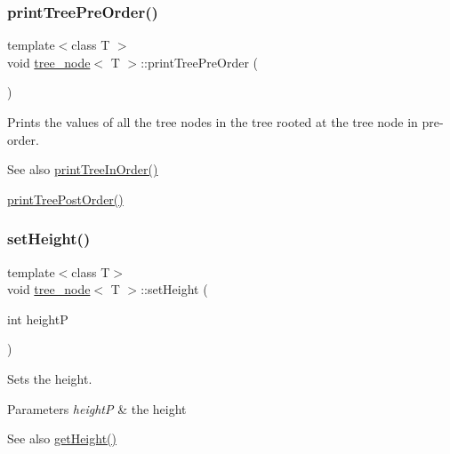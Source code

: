 \subsubsection{\texorpdfstring{print\+Tree\+Pre\+Order()}{printTreePreOrder()}}
{\footnotesize\ttfamily template$<$class T $>$ \\
void \hyperlink{classtree__node}{tree\+\_\+node}$<$ T $>$\+::print\+Tree\+Pre\+Order (\begin{DoxyParamCaption}{ }\end{DoxyParamCaption})}

Prints the values of all the tree nodes in the tree rooted at the tree node in pre-\/order. \begin{DoxySeeAlso}{See also}
\hyperlink{classtree__node_ae87818a195621d4defc1cde67e7219ee}{print\+Tree\+In\+Order()} 

\hyperlink{classtree__node_a4bfdd2b618c15252fcfbeab46ca05861}{print\+Tree\+Post\+Order()} 
\end{DoxySeeAlso}
\mbox{\label{classtree__node_a159ebd6d96c0e2111eb0ef6a36d50471}} 
\subsubsection{\texorpdfstring{set\+Height()}{setHeight()}}
{\footnotesize\ttfamily template$<$class T$>$ \\
void \hyperlink{classtree__node}{tree\+\_\+node}$<$ T $>$\+::set\+Height (\begin{DoxyParamCaption}\item[{int}]{heightP }\end{DoxyParamCaption})\hspace{0.3cm}{\ttfamily [inline]}}

Sets the height. 
\begin{DoxyParams}{Parameters}
{\em heightP} & the height \\
\hline
\end{DoxyParams}
\begin{DoxySeeAlso}{See also}
\hyperlink{classtree__node_a57c8b2000ad0a13b67532b81ba73720b}{get\+Height()} 
\end{DoxySeeAlso}
\mbox{\label{classtree__node_a3db979969a0fe8505ba65c7afabb5463}} 
